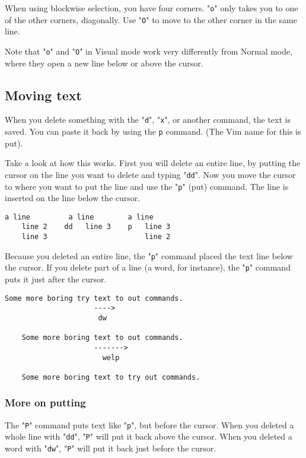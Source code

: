 When using blockwise selection, you have four corners.
"\verb!o!" only takes you to one of the other corners, diagonally.
Use "\verb!O!" to move to the other corner in the same line.

Note that "\verb!o!" and "\verb!O!" in Visual mode work very differently from Normal mode, where they open a new line below or above the cursor.

\subsection{Moving text}

When you delete something with the "\verb!d!", "\verb!x!", or another command, the text is saved.
You can paste it back by using the \verb:p: command.
(The Vim name for this is put).

Take a look at how this works.
First you will delete an entire line, by putting the cursor on the line you want to delete and typing "\verb!dd!".
Now you move the cursor to where you want to put the line and use the "\verb!p!" (put) command.
The line is inserted on the line below the cursor.

\begin{Verbatim}[samepage=true]
    a line         a line        a line
    line 2    dd   line 3    p   line 3
    line 3                       line 2
\end{Verbatim}

Because you deleted an entire line, the "\verb!p!" command placed the text line below the cursor.
If you delete part of a line (a word, for instance), the "\verb!p!" command puts it just after the cursor.

\begin{Verbatim}[samepage=true]
    Some more boring try text to out commands. 
                     ---->
                      dw

    Some more boring text to out commands. 
                     ------->
                       welp

    Some more boring text to try out commands. 
\end{Verbatim}

\subsubsection{More on putting}

The "\verb!P!" command puts text like "\verb!p!", but before the cursor.
When you deleted a whole line with "\verb!dd!", "\verb!P!" will put it back above the cursor.
When you deleted a word with "\verb!dw!", "\verb!P!" will put it back just before the cursor.

